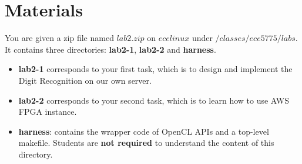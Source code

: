 \documentclass[paper=letter, fontsize=10pt]{scrartcl} %
\numberwithin{equation}{section} %
\numberwithin{figure}{section} %
\numberwithin{table}{section} %
\begin{document}
\section{Materials}
\label{materials}


You are given a zip file named 
$lab2.zip$ on $ecelinux$ under $/classes/ece5775/labs$. It contains three directories: \textbf{lab2-1}, \textbf{lab2-2} and \textbf{harness}. 

\begin{itemize}
	\item \textbf{lab2-1} corresponds to your first task, which is to design and implement the Digit Recognition on our own server.
	\item \textbf{lab2-2} corresponds to your second task, which is to learn how to use AWS FPGA instance.
	\item \textbf{harness}: contains the wrapper code of OpenCL APIs and a top-level makefile. Students are \textbf{not required} to understand the content of this directory.
\end{itemize}
\end{document}
